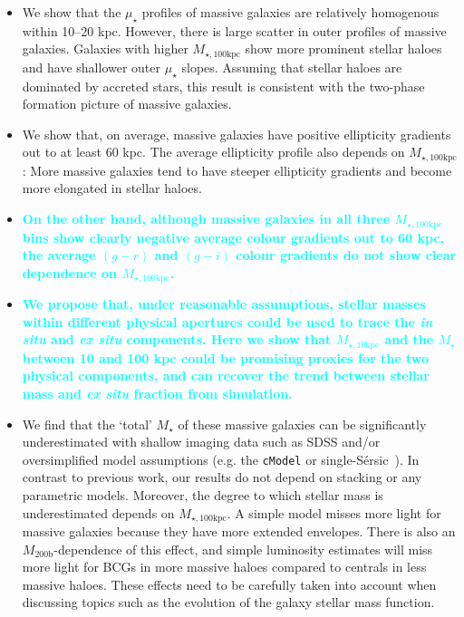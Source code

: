 \documentclass[fleqn,usenatbib]{mnras}
\def\ser{{S\'{e}rsic\ }}
\def\mstar{{$M_{\star}$}}
\def\mhalo{{$M_{\mathrm{200b}}$}}
\def\minn{{$M_{\star,10\mathrm{kpc}}$}}
\def\mtot{{$M_{\star,100\mathrm{kpc}}$}}
\def\mden{{$\mu_{\star}$}}
\newcommand{\song}[1]{\textcolor{cyan}{\textbf{#1}}}
\begin{document}
    \begin{itemize}  
        
        \item We show that the \mden{} profiles of massive galaxies are relatively
            homogenous within 10--20 kpc. 
            However, there is large scatter in outer profiles of massive galaxies. 
            Galaxies with higher \mtot{} show more prominent stellar haloes and have 
            shallower outer \mden{} slopes. 
            Assuming that stellar haloes are dominated by accreted stars, this result 
            is consistent with the two-phase formation picture of massive galaxies.
             
        \item We show that, on average, massive galaxies have positive ellipticity 
            gradients out to at least 60 kpc. 
            The average ellipticity profile also depends on \mtot{}: More massive 
            galaxies tend to have steeper ellipticity gradients and become more 
            elongated in stellar haloes. 
        
        \item \song{
            On the other hand, although massive galaxies in all three \mtot{} bins 
            show clearly negative average colour gradients out to 60 kpc, the 
            average $(g-r)$ and $(g-i)$ colour gradients do not show clear 
            dependence on \mtot{}. 
            }
            
        \item \song{
            We propose that, under reasonable assumptions, stellar masses within 
            different physical apertures could be used to trace the 
            \textit{in situ} and \textit{ex situ} components. 
            Here we show that \minn{} and the \mstar{} between 10 and 100 kpc could 
            be promising proxies for the two physical components, and can recover the 
            trend between stellar mass and \textit{ex situ} fraction from simulation.
            }
         
        \item We find that the `total' \mstar{} of these massive galaxies can be 
            significantly underestimated with shallow imaging data such as SDSS and/or 
            oversimplified model assumptions (e.g. the \texttt{cModel} or single-\ser). 
            In contrast to previous work, our results do not depend on stacking or any 
            parametric models. 
            Moreover, the degree to which stellar mass is underestimated depends on 
            \mtot{}. 
            A simple model misses more light for massive galaxies because they have 
            more extended envelopes. 
            There is also an \mhalo{}-dependence of this effect, and simple 
            luminosity estimates will miss more light for BCGs in more massive 
            haloes compared to centrals in less massive haloes.
            These effects need to be carefully taken into account when discussing 
            topics such as the evolution of the galaxy stellar mass function.  
                        
    \end{itemize}
\end{document}
